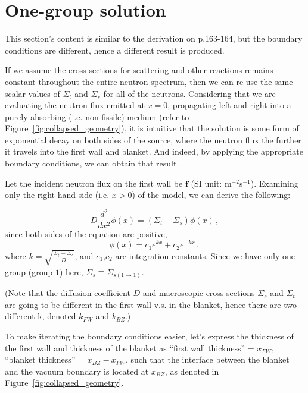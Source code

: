 \documentclass[a4paper, 12pt]{article}
\begin{document}
\section{One-group solution}
This section's content is similar to the derivation on p.163-164, but the boundary conditions are different, hence a different result is produced.

If we assume the cross-sections for scattering and other reactions remains constant throughout the entire neutron spectrum, then we can re-use the same scalar values of $\Sigma_t$ and $\Sigma_s$ for all of the neutrons. Considering that we are evaluating the neutron flux emitted at $x=0$, propagating left and right into a purely-absorbing (i.e. non-fissile) medium (refer to Figure~\ref{fig:collapsed_geometry}), it is intuitive that the solution is some form of exponential decay on both sides of the source, where the neutron flux the further it travels into the first wall and blanket. And indeed, by applying the appropriate boundary conditions, we can obtain that result.

Let the incident neutron flux on the first wall be $\boldsymbol{f}$ (SI unit: m$^{-2}$s$^{-1}$). Examining only the right-hand-side (i.e. $x>0$) of the model, we can derive the following:

\begin{equation}
    D \frac{d^2}{dx^2}\phi(x) = (\Sigma_t - \Sigma_s) \phi(x)\,,
\end{equation}
since both sides of the equation are positive,
\begin{equation}
    \phi(x) = c_1 e^{kx} + c_2 e^{-kx}\,,
\end{equation}
where $k=\sqrt{\frac{\Sigma_t-\Sigma_s}{D}}$, and $c_1$,$c_2$ are integration constants.
Since we have only one group (group $1$) here, $\Sigma_s\equiv \Sigma_{s(1\rightarrow1)}$.

(Note that the diffusion coefficient $D$ and macroscopic cross-sections $\Sigma_s$ and $\Sigma_t$ are going to be different in the first wall v.s. in the blanket, hence there are two different k, denoted $k_{FW}$ and $k_{BZ}$.)

To make iterating the boundary conditions easier, let's express the thickness of the first wall and thickness of the blanket as ``first wall thickness'' = $x_{FW}$, ``blanket thickness'' = $x_{BZ} - x_{FW}$, such that the interface between the blanket and the vacuum boundary is located at $x_{BZ}$, as denoted in Figure~\ref{fig:collapsed_geometry}.
\end{document}
